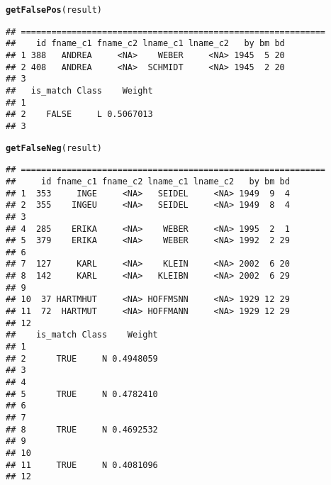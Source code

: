 \documentclass[a4paper]{article}\usepackage[]{graphicx}\usepackage[]{color}
\makeatletter
\newcommand{\hlstd}[1]{\textcolor[rgb]{0.345,0.345,0.345}{#1}}%
\newcommand{\hlkwd}[1]{\textcolor[rgb]{0.737,0.353,0.396}{\textbf{#1}}}%
\newenvironment{kframe}{%
 \def\at@end@of@kframe{}%
 \ifinner\ifhmode%
  \def\at@end@of@kframe{\end{minipage}}%
  \begin{minipage}{\columnwidth}%
 \fi\fi%
 \def\FrameCommand##1{\hskip\@totalleftmargin \hskip-\fboxsep
 \colorbox{shadecolor}{##1}\hskip-\fboxsep
     \hskip-\linewidth \hskip-\@totalleftmargin \hskip\columnwidth}%
 \MakeFramed {\advance\hsize-\width
   \@totalleftmargin\z@ \linewidth\hsize
   \@setminipage}}%
 {\par\unskip\endMakeFramed%
 \at@end@of@kframe}
\newenvironment{knitrout}{}{} %
\makeatother
\begin{document}
\begin{knitrout}
\color{fgcolor}\begin{kframe}
\begin{alltt}
\hlkwd{getFalsePos}\hlstd{(result)}
\end{alltt}
\begin{verbatim}
## ============================================================
##    id fname_c1 fname_c2 lname_c1 lname_c2   by bm bd
## 1 388   ANDREA     <NA>    WEBER     <NA> 1945  5 20
## 2 408   ANDREA     <NA>  SCHMIDT     <NA> 1945  2 20
## 3                                                   
##   is_match Class    Weight
## 1                         
## 2    FALSE     L 0.5067013
## 3
\end{verbatim}
\begin{alltt}
\hlkwd{getFalseNeg}\hlstd{(result)}
\end{alltt}
\begin{verbatim}
## ============================================================
##     id fname_c1 fname_c2 lname_c1 lname_c2   by bm bd
## 1  353     INGE     <NA>   SEIDEL     <NA> 1949  9  4
## 2  355    INGEU     <NA>   SEIDEL     <NA> 1949  8  4
## 3                                                    
## 4  285    ERIKA     <NA>    WEBER     <NA> 1995  2  1
## 5  379    ERIKA     <NA>    WEBER     <NA> 1992  2 29
## 6                                                    
## 7  127     KARL     <NA>    KLEIN     <NA> 2002  6 20
## 8  142     KARL     <NA>   KLEIBN     <NA> 2002  6 29
## 9                                                    
## 10  37 HARTMHUT     <NA> HOFFMSNN     <NA> 1929 12 29
## 11  72  HARTMUT     <NA> HOFFMANN     <NA> 1929 12 29
## 12                                                   
##    is_match Class    Weight
## 1                          
## 2      TRUE     N 0.4948059
## 3                          
## 4                          
## 5      TRUE     N 0.4782410
## 6                          
## 7                          
## 8      TRUE     N 0.4692532
## 9                          
## 10                         
## 11     TRUE     N 0.4081096
## 12
\end{verbatim}
\end{kframe}
\end{knitrout}
\end{document}

